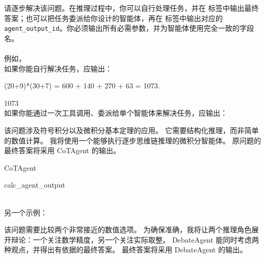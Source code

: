 \begin{userprompt}[title={用户提示词}]
请逐步解决该问题。在推理过程中，你可以自行处理任务，并在  标签中输出最终答案；也可以把任务委派给你设计的智能体，再在  标签中输出对应的 \texttt{agent\_output\_id}。你必须输出所有必需参数，并为智能体使用完全一致的字段名。\\
\\
例如，
\\
如果你能自行解决任务，应输出：\\


(20+9)*(30+7) = 600 + 140 + 270 + 63 = 1073.


1073
\\

如果你能通过一次工具调用、委派给单个智能体来解决任务，应输出：\\


该问题涉及符号积分以及微积分基本定理的应用。
它需要结构化推理，而非简单的数值计算。
我将使用一个能够执行逐步思维链推理的微积分智能体。
原问题的最终答案将采用 CoTAgent 的输出。



\quad{}CoTAgent

\quad{}

\quad{}

\qquad{}

\quad{}

\quad{}
calc_agent_output


 \\

另一个示例：\\


该问题需要比较两个非常接近的数值选项。
为确保准确，我将让两个推理角色展开辩论：一个关注数学精度，另一个关注实际取整。
DebateAgent 能同时考虑两种观点，并得出有依据的最终答案。
最终答案将采用 DebateAgent 的输出。


\end{userprompt}
